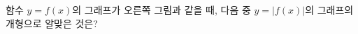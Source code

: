 \noindent\begin{minipage}[t]{0.58\linewidth}\vspace{0pt}\raggedright 함수 $y=f(x)$의 그래프가 오른쪽 그림과 같을 때, 다음 중 $y=|f(x)|$의 그래프의 개형으로 알맞은 것은?\end{minipage}\hfill\begin{minipage}[t]{0.4\linewidth}\vspace{0pt}\centering \resizebox{\ifdim\width>\linewidth\linewidth\else\width\fi}{!}{}\end{minipage}\par
\begin{choicesii}{}{}{}{}{}\end{choicesii}

